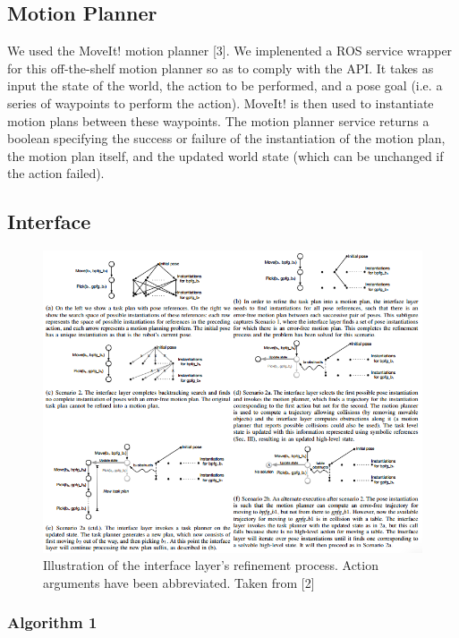 \documentclass[12pt]{article}
\begin{document}
\subsection{Motion Planner}
We used the MoveIt! motion planner [3]. 
We implenented a ROS service wrapper for this off-the-shelf motion planner so as to comply with the API.
It takes as input the state of the world, the action to be performed, and a pose goal (i.e. a series of waypoints to perform the action).
MoveIt! is then used to instantiate motion plans between these waypoints. 
The motion planner service returns a boolean specifying the success or failure of the instantiation of the motion plan, the motion plan itself, and the updated world state (which can be unchanged if the action failed).

\subsection{Interface}

\begin{figure}[t]
\centering
\includegraphics[width=\textwidth]{figure4}
\caption{Illustration of the interface layer’s refinement process. 
Action arguments have been abbreviated. 
Taken from [2]
\label{fig:figure4}}
\end{figure}

\subsubsection{Algorithm 1}
\end{document}

